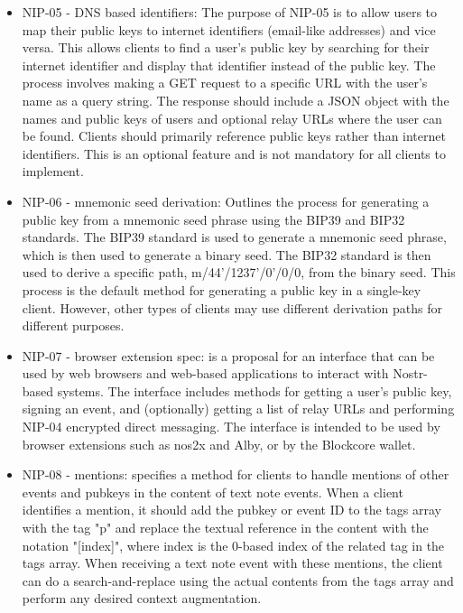 \begin{itemize}
\item NIP-05 - DNS based identifiers: The purpose of NIP-05 is to allow users to map their public keys to internet identifiers (email-like addresses) and vice versa. This allows clients to find a user's public key by searching for their internet identifier and display that identifier instead of the public key. The process involves making a GET request to a specific URL with the user's name as a query string. The response should include a JSON object with the names and public keys of users and optional relay URLs where the user can be found. Clients should primarily reference public keys rather than internet identifiers. This is an optional feature and is not mandatory for all clients to implement.
\item NIP-06 - mnemonic seed derivation: Outlines the process for generating a public key from a mnemonic seed phrase using the BIP39 and BIP32 standards. The BIP39 standard is used to generate a mnemonic seed phrase, which is then used to generate a binary seed. The BIP32 standard is then used to derive a specific path, m/44'/1237'/0'/0/0, from the binary seed. This process is the default method for generating a public key in a single-key client. However, other types of clients may use different derivation paths for different purposes.
\item NIP-07 - browser extension spec: is a proposal for an interface that can be used by web browsers and web-based applications to interact with Nostr-based systems. The interface includes methods for getting a user's public key, signing an event, and (optionally) getting a list of relay URLs and performing NIP-04 encrypted direct messaging. The interface is intended to be used by browser extensions such as nos2x and Alby, or by the Blockcore wallet.
\item NIP-08 - mentions: specifies a method for clients to handle mentions of other events and pubkeys in the content of text note events. When a client identifies a mention, it should add the pubkey or event ID to the tags array with the tag "p" and replace the textual reference in the content with the notation "[index]", where index is the 0-based index of the related tag in the tags array. When receiving a text note event with these mentions, the client can do a search-and-replace using the actual contents from the tags array and perform any desired context augmentation.

\end{itemize}
